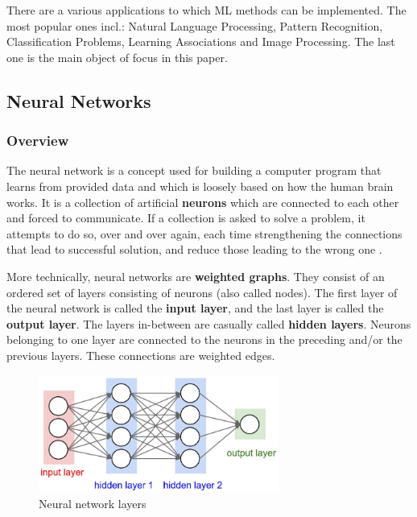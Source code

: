 \documentclass[../Main.tex]{subfiles}
\begin{document}
    There are a various applications to which ML methods can be implemented. The most popular ones \cite{MLgoogle} incl.: Natural Language Processing, Pattern Recognition, Classification Problems, Learning Associations and Image Processing. The last one is the main object of focus in this paper.

\newpage

\subsection{Neural Networks}
    \subsubsection{Overview}
    The neural network is a concept used for building a computer program that learns from provided data and which is loosely based on how the human brain works. It is a collection of artificial \textbf{neurons} which are connected to each other and forced to communicate. If a collection is asked to solve a problem, it attempts to do so, over and over again, each time strengthening the connections that lead to successful solution, and reduce those leading to the wrong one \cite{tfplayground}.
    
    More technically, neural networks are \textbf{weighted graphs}. They consist of an ordered set of layers consisting of neurons (also called nodes). The first layer of the neural network is called the \textbf{input layer}, and the last layer is called the \textbf{output layer}. The layers in-between are casually called \textbf{hidden layers}. Neurons belonging to one layer are connected to the neurons in the preceding and/or the previous layers. These connections are weighted edges. \\ 
    \begin{figure}[ht!]
        \centering
        \includegraphics[width=0.7\textwidth]{Images/02_cnn_network_layers.jpeg}
        \caption{Neural network layers \cite{dlstanford}}
        \label{fig:02_cnn_network_layers}
    \end{figure}
\end{document}
